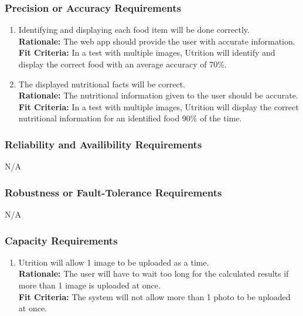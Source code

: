 \documentclass[12pt]{article}
\begin{document}
\subsubsection{Precision or Accuracy Requirements}

\begin{enumerate}[start=2,label={PR\arabic*.}]
	\item Identifying and displaying each food item will be done correctly. \\
	\textbf{Rationale:} The web app should provide the user with accurate information. \\
	\textbf{Fit Criteria:} In a test with multiple images, Utrition will identify and display the correct food with an average accuracy of 70\%.
	\item  The displayed nutritional facts will be correct. \\
	\textbf{Rationale:} The nutritional information given to the user should be accurate. \\
	\textbf{Fit Criteria:} In a test with multiple images, Utrition will display the correct nutritional information for an identified food 90\% of the time.
\end{enumerate}

\subsubsection{Reliability and Availibility Requirements}
\hspace{1.5cm}N/A

\subsubsection{Robustness or Fault-Tolerance Requirements}
\hspace{1.5cm}N/A

\subsubsection{Capacity Requirements}

\begin{enumerate}[{PR}17. ] 
	\item Utrition will allow 1 image to be uploaded as a time.\\
	\textbf{Rationale:} The user will have to wait too long for the calculated results if more than 1 image is uploaded at once. \\
	\textbf{Fit Criteria:} The system will not allow more than 1 photo to be uploaded at once.
\end{enumerate}
\end{document}
